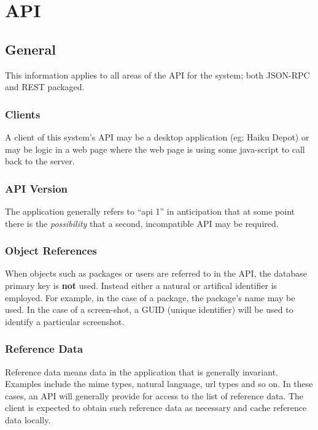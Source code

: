 
\section{API}
\label{api}

\subsection{General}

This information applies to all areas of the API for the system; both JSON-RPC and REST packaged.

\subsubsection{Clients}

A client of this system's API may be a desktop application (eg; Haiku Depot) or may be logic in a web page where the web page is using some java-script to call back to the server.

\subsubsection{API Version}

The application generally refers to ``api 1'' in anticipation that at some point there is the {\it possibility} that a second, incompatible API may be required.

\subsubsection{Object References}

When objects such as packages or users are referred to in the API, the database primary key is {\bf not} used.  Instead either a natural or artifical identifier is employed.  For example, in the case of a package, the package's name may be used.  In the case of a screen-shot, a GUID (unique identifier) will be used to identify a particular screenshot.

\subsubsection{Reference Data}

Reference data means data in the application that is generally invariant.  Examples include the mime types, natural language, url types and so on.  In these cases, an API will generally provide for access to the list of reference data.  The client is expected to obtain such reference data as necessary and cache reference data locally.

